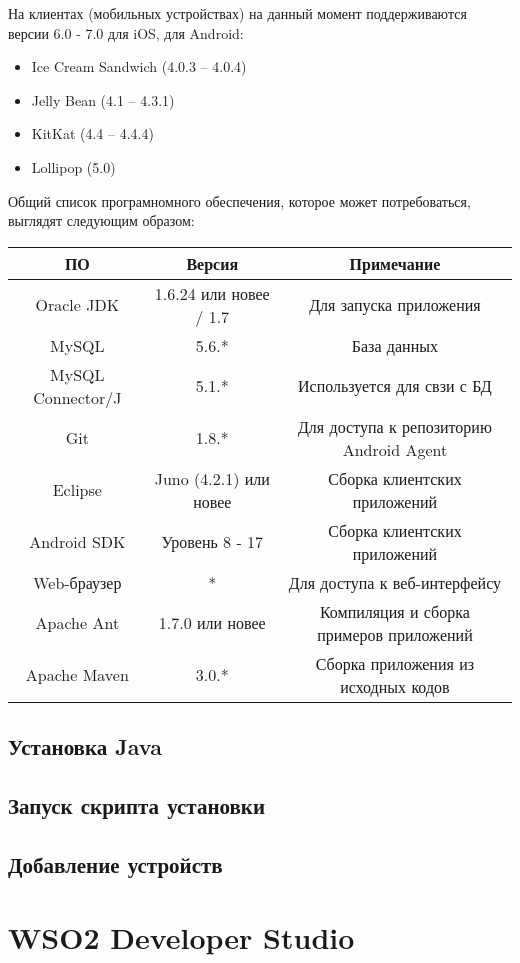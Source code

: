 \documentclass[a4paper, 12pt]{article}		%
\begin{document}
На клиентах (мобильных устройствах) на данный момент поддерживаются версии 6.0 - 7.0 для iOS, для Android:
\begin{itemize}
\item Ice Cream Sandwich (4.0.3 – 4.0.4)
\item Jelly Bean (4.1 – 4.3.1)
\item KitKat (4.4 – 4.4.4)
\item Lollipop (5.0)
\end{itemize}

Общий список програмномного обеспечения, которое может потребоваться, выглядят следующим образом:

\begin{tabular}{|c|c|c|}
\hline 
ПО & Версия & Примечание \\ 
\hline 
{Oracle JDK} & 1.6.24 или новее / 1.7 & Для запуска приложения \\ 
\hline 
MySQL & 5.6.* & База данных \\ 
\hline 
MySQL Connector/J & 5.1.* & Используется для свзи с БД \\ 
\hline 
Git & 1.8.* & Для доступа к репозиторию Android Agent \\ 
\hline 
Eclipse & Juno (4.2.1) или новее & Сборка клиентских приложений \\ 
\hline 
Android SDK & Уровень 8 - 17 & Сборка клиентских приложений \\ 
\hline 
Web-браузер & * & Для доступа к веб-интерфейсу \\ 
\hline 
Apache Ant & 1.7.0 или новее & Компиляция и сборка примеров приложений \\ 
\hline 
Apache Maven & 3.0.* & Сборка приложения из исходных кодов \\ 
\hline 
\end{tabular} 

\subsection{Установка Java}

\subsection{Запуск скрипта установки}

\subsection{Добавление устройств}

\section{WSO2 Developer Studio}
\end{document}
